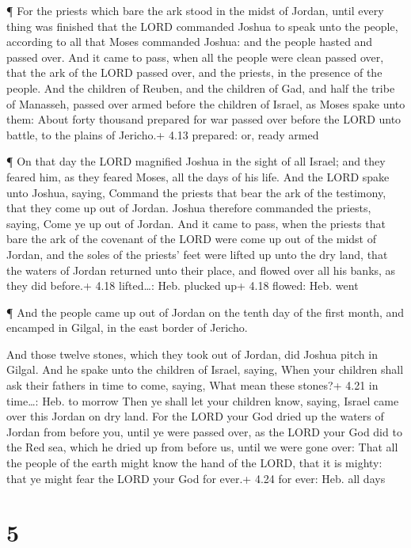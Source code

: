  ¶ For the priests which bare the ark stood in the midst of
Jordan, until every thing was finished that the LORD commanded Joshua to
speak unto the people, according to all that Moses commanded Joshua: and
the people hasted and passed over.  And it came to pass,
when all the people were clean passed over, that the ark of the LORD
passed over, and the priests, in the presence of the people.
 And the children of Reuben, and the children of Gad, and
half the tribe of Manasseh, passed over armed before the children of
Israel, as Moses spake unto them:  About forty thousand
prepared for war passed over before the LORD unto battle, to the plains
of Jericho.+ 4.13 prepared: or, ready armed

 ¶ On that day the LORD magnified Joshua in the sight of
all Israel; and they feared him, as they feared Moses, all the days of
his life.  And the LORD spake unto Joshua, saying,
 Command the priests that bear the ark of the testimony,
that they come up out of Jordan.  Joshua therefore
commanded the priests, saying, Come ye up out of Jordan. 
And it came to pass, when the priests that bare the ark of the covenant
of the LORD were come up out of the midst of Jordan, and the soles of
the priests' feet were lifted up unto the dry land, that the waters of
Jordan returned unto their place, and flowed over all his banks, as they
did before.+ 4.18 lifted\ldots: Heb. plucked up+ 4.18 flowed: Heb. went

 ¶ And the people came up out of Jordan on the tenth day of
the first month, and encamped in Gilgal, in the east border of Jericho.

 And those twelve stones, which they took out of Jordan,
did Joshua pitch in Gilgal.  And he spake unto the children
of Israel, saying, When your children shall ask their fathers in time to
come, saying, What mean these stones?+ 4.21 in time\ldots: Heb. to
morrow  Then ye shall let your children know, saying,
Israel came over this Jordan on dry land.  For the LORD
your God dried up the waters of Jordan from before you, until ye were
passed over, as the LORD your God did to the Red sea, which he dried up
from before us, until we were gone over:  That all the
people of the earth might know the hand of the LORD, that it is mighty:
that ye might fear the LORD your God for ever.+ 4.24 for ever: Heb. all
days

\hypertarget{section-4}{%
\section{5}\label{section-4}}

